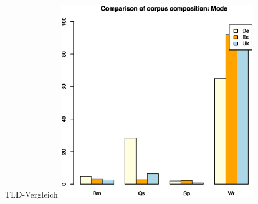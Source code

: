 \begin{frame}
  {TLD-Vergleich}
  \centering
  \includegraphics[width=0.65\textwidth]{graphics/mode}
\end{frame}

